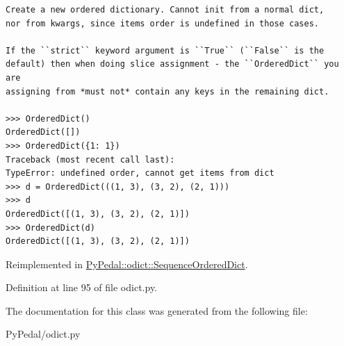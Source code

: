 \footnotesize\begin{verbatim}
Create a new ordered dictionary. Cannot init from a normal dict,
nor from kwargs, since items order is undefined in those cases.

If the ``strict`` keyword argument is ``True`` (``False`` is the
default) then when doing slice assignment - the ``OrderedDict`` you are
assigning from *must not* contain any keys in the remaining dict.

>>> OrderedDict()
OrderedDict([])
>>> OrderedDict({1: 1})
Traceback (most recent call last):
TypeError: undefined order, cannot get items from dict
>>> d = OrderedDict(((1, 3), (3, 2), (2, 1)))
>>> d
OrderedDict([(1, 3), (3, 2), (2, 1)])
>>> OrderedDict(d)
OrderedDict([(1, 3), (3, 2), (2, 1)])
\end{verbatim}
\normalsize
 

Reimplemented in \hyperlink{classPyPedal_1_1odict_1_1SequenceOrderedDict_622163e06c3058e0bbca95a379f21a00}{PyPedal::odict::SequenceOrderedDict}.

Definition at line 95 of file odict.py.

The documentation for this class was generated from the following file:\begin{CompactItemize}
\item 
PyPedal/odict.py\end{CompactItemize}
